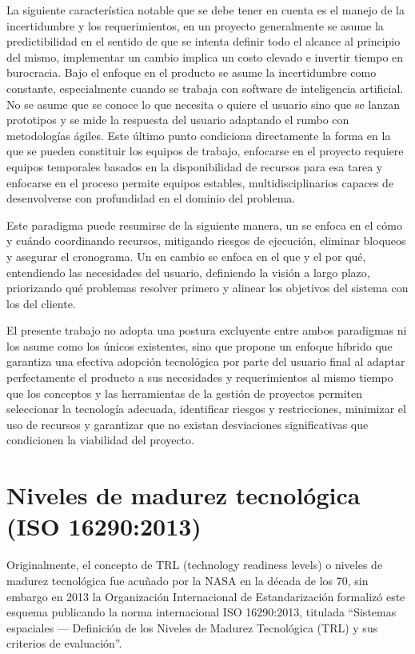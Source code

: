 La siguiente característica notable que se debe tener en cuenta es el manejo de la incertidumbre y los requerimientos, en un proyecto generalmente se asume la predictibilidad en el sentido de que se intenta definir todo el alcance al principio del mismo, implementar un cambio implica un costo elevado e invertir tiempo en burocracia. Bajo el enfoque en el producto se asume la incertidumbre como constante, especialmente cuando se trabaja con software de inteligencia artificial. No se asume que se conoce lo que necesita o quiere el usuario sino que se lanzan prototipos y se mide la respuesta del usuario adaptando el rumbo con metodologías ágiles. Este último punto condiciona directamente la forma en la que se pueden constituir los equipos de trabajo, enfocarse en el proyecto requiere equipos temporales basados en la disponibilidad de recursos para esa tarea y enfocarse en el proceso permite equipos estables, multidisciplinarios capaces de desenvolverse con profundidad en el dominio del problema.

Este paradigma puede resumirse de la siguiente manera, un  se enfoca en el cómo y cuándo coordinando recursos, mitigando riesgos de ejecución, eliminar bloqueos y asegurar el cronograma. Un  en cambio se enfoca en el que y el por qué, entendiendo las necesidades del usuario, definiendo la visión a largo plazo, priorizando qué problemas resolver primero y alinear los objetivos del sistema con los del cliente.

El presente trabajo no adopta una postura excluyente entre ambos paradigmas ni los asume como los únicos existentes, sino que propone un enfoque híbrido que garantiza una efectiva adopción tecnológica por parte del usuario final al adaptar perfectamente el producto a sus necesidades y requerimientos al mismo tiempo que los conceptos y las herramientas de la gestión de proyectos permiten seleccionar la tecnología adecuada, identificar riesgos y restricciones, minimizar el uso de recursos y garantizar que no existan desviaciones significativas que condicionen la viabilidad del proyecto.

\section{Niveles de madurez tecnológica (ISO 16290:2013)}\label{niveles-de-madurez-tecnoluxf3gica-iso-162902013}

Originalmente, el concepto de TRL (technology readiness levels) o niveles de madurez tecnológica fue acuñado por la NASA en la década de los 70, sin embargo en 2013 la Organización Internacional de Estandarización formalizó este esquema publicando la norma internacional ISO 16290:2013, titulada \enquote{Sistemas espaciales --- Definición de los Niveles de Madurez Tecnológica (TRL) y sus criterios de evaluación}.

